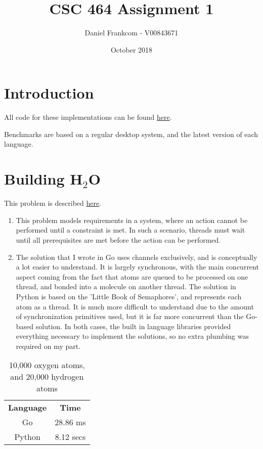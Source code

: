 \documentclass[a4paper,10pt]{article}
\title{CSC 464 Assignment 1}
\author{Daniel Frankcom - V00843671}
\date{October 2018}
\begin{document}
\maketitle

\section{Introduction}

All code for these implementations can be found \href{https://github.com/danielfrankcom/CSC464/tree/master/as1}{here}. \newline

\noindent Benchmarks are based on a regular desktop system, and the latest version of each language.

\section{Building H$_2$O}
This problem is described \href{http://greenteapress.com/semaphores/LittleBookOfSemaphores.pdf#section.5.6}{here}.

\begin{enumerate}
    \item This problem models requirements in a system, where an action cannot be performed until a constraint is met. In such a scenario, threads must wait until all prerequisites are met before the action can be performed.
    \item The solution that I wrote in Go uses channels exclusively, and is conceptually a lot easier to understand. It is largely synchronous, with the main concurrent aspect coming from the fact that atoms are queued to be processed on one thread, and bonded into a molecule on another thread. The solution in Python is based on the 'Little Book of Semaphores', and represents each atom as a thread. It is much more difficult to understand due to the amount of synchronization primitives used, but it is far more concurrent than the Go-based solution. In both cases, the built in language libraries provided everything necessary to implement the solutions, so no extra plumbing was required on my part.
\end{enumerate}

\begin{table}[h]
    \centering
    \begin{tabular}{cc}
        \textbf{Language} & \textbf{Time}\\
        Go & 28.86 ms\\
        Python & 8.12 secs
    \end{tabular}
    \caption{10,000 oxygen atoms, and 20,000 hydrogen atoms}
\end{table}
\end{document}
